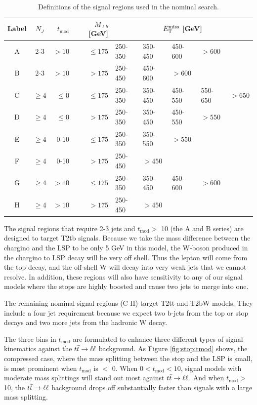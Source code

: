 \begin{table}[htb]
\centering
\caption{Definitions of the signal regions used in the nominal search.}
\label{tab:stop:nominalsrs}
\begin{tabular}{|c|c|r|r|lllll|}
\hline
Label & $N_J$ & $t_\text{mod}$ & $M_{\ell b}$ [GeV] & \multicolumn{5}{c|}{$E_\text{T}^\text{miss}$ [GeV]} \\
\hline
A & 2-3     & $>10$ & $\leq175$     & 250-350 & 350-450 & 450-600 & $>600$ & \\
B & 2-3     & $>10$ & $>175$        & 250-450 & 450-600 & $>600$ & & \\
C & $\geq4$ & $\leq0$ & $\leq175$   & 250-350 & 350-450 & 450-550 & 550-650 & $>650$ \\
D & $\geq4$ & $\leq0$ & $>175$      & 250-350 & 350-450 & 450-550 & $>550$ & \\
E & $\geq4$ & 0-10 & $\leq175$      & 250-350 & 350-550 & $>550$ & & \\
F & $\geq4$ & 0-10 & $>175$         & 250-450 & $>450$ & & & \\
G & $\geq4$ & $>10$ & $\leq175$     & 250-350 & 350-450 & 450-600 & $>600$ & \\
H & $\geq4$ & $>10$ & $>175$        & 250-450 & $>450$ & & & \\
\hline
\end{tabular}
\end{table}

The signal regions that require 2-3 jets and $t_\text{mod} >$ 10
(the A and B series) are
designed to target T2tb signals. Because we take the mass difference
between the chargino and the LSP to be only 5 GeV in this model, the
W-boson produced in the chargino to LSP decay will be very off
shell. Thus the lepton will come from the top decay, and the off-shell
W will decay into very weak jets that we cannot resolve. In addition,
these regions will also have sensitivity to any of our signal models
where the stops are highly boosted and cause two jets to merge into one.

The remaining nominal signal regions (C-H) target T2tt and T2bW
models. They include a four jet requirement because we expect two b-jets from the
top or stop decays and two more jets from the hadronic W decay.

The three bins in $t_\text{mod}$ are formulated to enhance three different
types of signal kinematics against the $t\bar{t} \rightarrow \ell\ell$
background. As Figure \ref{fig:stop:tmod} shows, the compressed
case, where the mass splitting
between the stop and the LSP is small, is most prominent when
$t_\text{mod}$ is $<$ 0. When $0 < t_\text{mod} < 10$, signal models %
with moderate mass splittings will stand out most against
$t\bar{t} \rightarrow \ell\ell$. And when $t_\text{mod} >$ 10, the $t\bar{t} \rightarrow \ell\ell$ background
drops off substantially faster than signals with a large mass
splitting.

